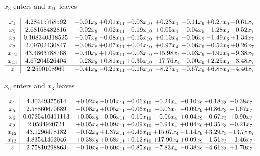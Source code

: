 \documentclass[9pt]{article}
\begin{document}
 $ x_{3} $ enters and $ x_{10} $ leaves 

 \[\begin{array}{c| c c@{\hskip 2pt} c@{\hskip 2pt} c@{\hskip 2pt} c@{\hskip 2pt} c@{\hskip 2pt} c@{\hskip 2pt} c@{\hskip 2pt} }
 x_{1}   &  4.28415758592 & +  0.01 x_{8} & +  0.01 x_{11} & -0.03 x_{10} & +  0.23 x_{4} & -0.11 x_{9} & +  0.27 x_{6} & -0.61 x_{7}\\
 x_{5}   &  2.68168482816 & -0.02 x_{8} & -0.02 x_{11} & -0.19 x_{10} & +  0.05 x_{4} & -0.04 x_{9} & -1.28 x_{6} & -0.52 x_{7}\\
 x_{3}   &  0.108340318525 & +  0.07 x_{8} & -0.08 x_{11} & -0.15 x_{10} & +  0.10 x_{4} & +  0.06 x_{9} & -1.49 x_{6} & +  1.34 x_{7}\\
 x_{2}   &  2.09702430847 & +  0.08 x_{8} & +  0.07 x_{11} & +  0.04 x_{10} & +  0.97 x_{4} & +  0.06 x_{9} & -0.52 x_{6} & +  0.26 x_{7}\\
 x_{12}   &  43.4863788768 & -0.40 x_{8} & +  1.09 x_{11} & -0.03 x_{10} & + 15.98 x_{4} & -0.93 x_{9} & -4.92 x_{6} & -9.38 x_{7}\\
 x_{13}   &  4.67204526404 & +  0.28 x_{8} & +  0.81 x_{11} & +  0.35 x_{10} & + 17.76 x_{4} & -0.00 x_{9} & +  2.25 x_{6} & -3.48 x_{7}\\
\hline
z    &  2.2590108969 & -0.41 x_{8} & -0.21 x_{11} & -0.16 x_{10} & -8.27 x_{4} & -0.67 x_{9} & +  6.88 x_{6} & -4.46 x_{7}\\
\end{array}\]


 $ x_{6} $ enters and $ x_{3} $ leaves 

 \[\begin{array}{c| c c@{\hskip 2pt} c@{\hskip 2pt} c@{\hskip 2pt} c@{\hskip 2pt} c@{\hskip 2pt} c@{\hskip 2pt} c@{\hskip 2pt} }
 x_{1}   &  4.30349375614 & +  0.02 x_{8} & -0.01 x_{11} & -0.06 x_{10} & +  0.24 x_{4} & -0.10 x_{9} & -0.18 x_{3} & -0.38 x_{7}\\
 x_{5}   &  2.58860670689 & -0.08 x_{8} & +  0.05 x_{11} & -0.06 x_{10} & -0.03 x_{4} & -0.09 x_{9} & +  0.86 x_{3} & -1.67 x_{7}\\
 x_{6}   &  0.0725410411113 & +  0.05 x_{8} & -0.06 x_{11} & -0.10 x_{10} & +  0.06 x_{4} & +  0.04 x_{9} & -0.67 x_{3} & +  0.90 x_{7}\\
 x_{2}   &  2.0594920724 & +  0.05 x_{8} & +  0.09 x_{11} & +  0.09 x_{10} & +  0.94 x_{4} & +  0.04 x_{9} & +  0.35 x_{3} & -0.21 x_{7}\\
 x_{12}   &  43.1296478182 & -0.62 x_{8} & +  1.37 x_{11} & +  0.46 x_{10} & + 15.67 x_{4} & -1.14 x_{9} & +  3.29 x_{3} & -13.78 x_{7}\\
 x_{13}   &  4.83541462046 & +  0.38 x_{8} & +  0.68 x_{11} & +  0.12 x_{10} & + 17.90 x_{4} & +  0.09 x_{9} & -1.51 x_{3} & -1.46 x_{7}\\
\hline
z    &  2.75810298863 & -0.10 x_{8} & -0.60 x_{11} & -0.85 x_{10} & -7.83 x_{4} & -0.38 x_{9} & -4.61 x_{3} & +  1.70 x_{7}\\
\end{array}\]
\end{document}
